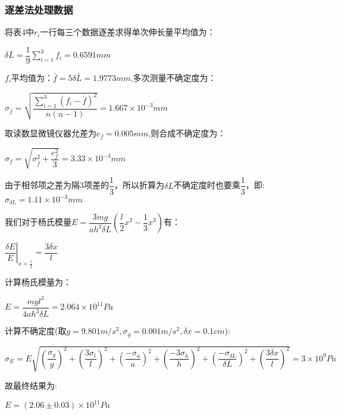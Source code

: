 \documentclass[a4 paper,12pt]{article}
\begin{document}
\subsubsection{逐差法处理数据}
将表4中$r_{i}$一行每三个数据逐差求得单次伸长量平均值为：
\begin{center}
	$\delta \bar{L}=\dfrac{1}{9}\sum\limits_{i=1}^{3}f_{i}=0.6591mm$
\end{center}
\par $f_{i}$平均值为：$\bar{f}=5\delta \bar{L}=1.9773mm$,多次测量不确定度为：
\begin{center}
	$\sigma_{\bar{f}}=\sqrt{\dfrac{\sum\limits_{i=1}^{3}(f_{i}-\bar{f})^{2}}{n(n-1)}}=1.667\times10^{-3}mm$
\end{center}
\par 取读数显微镜仪器允差为$e_{f}=0.005mm$,则合成不确定度为：
\begin{center}
	$\sigma_{f}=\sqrt{\sigma_{\bar{f}}^{2}+\dfrac{e_{f}^{2}}{3}}=3.33\times 10^{-3}mm$
\end{center}
\par 由于相邻项之差为隔3项差的$\dfrac{1}{3}$，所以折算为$\delta L$不确定度时也要乘$\dfrac{1}{3}$，即:$\sigma_{\delta L}=1.11\times10^{-3}mm$
\par 我们对于杨氏模量$E=\dfrac{3mg}{ah^{3}\delta L}(\dfrac{l}{2}x^{2}-\dfrac{1}{3}x^{3})$有：
\begin{center}
	$\left.\dfrac{\delta E}{E}\right|_{x=\frac{l}{2}}=\dfrac{3\delta x}{l}$
\end{center}
\par 计算杨氏模量为：
\begin{center}
	$E=\dfrac{mgl^{3}}{4ah^{3}\delta L}=2.064\times10^{11}Pa$
\end{center}
\par 计算不确定度(取$g=9.801m/s^{2},\sigma_{g}=0.001m/s^{2},\delta x=0.1cm$):
\begin{center}
	$\sigma_{E}=E\sqrt{(\dfrac{\sigma_{g}}{g})^{2}+(\dfrac{3\sigma_{l}}{l})^{2}+(\dfrac{-\sigma_{a}}{a})^{2}+(\dfrac{-3\sigma_{h}}{h})^{2}+(\dfrac{-\sigma_{\delta L}}{\delta L})^{2}+(\dfrac{3\delta x}{l})^{2}}=3\times10^{9}Pa$
\end{center}
\par 故最终结果为:
\begin{center}
	$E=(2.06\pm0.03)\times10^{11}Pa$
\end{center}
\end{document}

